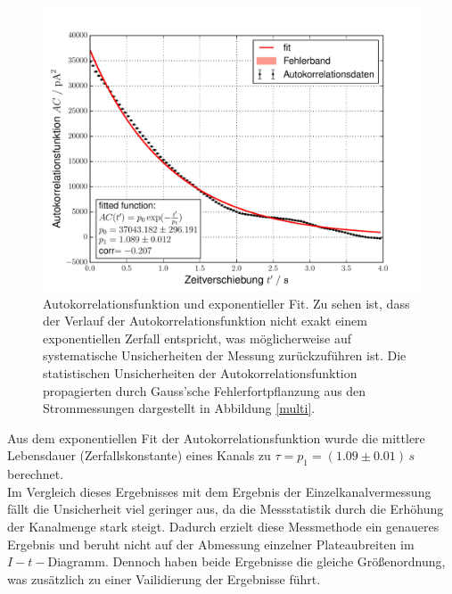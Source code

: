 \documentclass{include/thesisclass3}
\newcommand{\e}[1]{\,\si{#1}}
\begin{document}
\begin{figure}[H]
\centering
\includegraphics[scale=0.7]{images/AC.pdf}
\caption{Autokorrelationsfunktion und exponentieller Fit. Zu sehen ist, dass der Verlauf der Autokorrelationsfunktion nicht exakt einem exponentiellen Zerfall entspricht, was möglicherweise auf systematische Unsicherheiten der Messung zurückzuführen ist. Die statistischen Unsicherheiten der Autokorrelationsfunktion propagierten durch Gauss'sche Fehlerfortpflanzung aus den Strommessungen dargestellt in Abbildung \ref{multi}. }
\label{AC}
\end{figure}
Aus dem exponentiellen Fit der Autokorrelationsfunktion wurde die mittlere Lebensdauer (Zerfallskonstante) eines Kanals zu $\tau = p_1 = (1.09 \pm 0.01)\e{s}$ berechnet.\\
Im Vergleich dieses Ergebnisses mit dem Ergebnis der Einzelkanalvermessung fällt die Unsicherheit viel geringer aus, da die Messstatistik durch die Erhöhung der Kanalmenge stark steigt. Dadurch erzielt diese Messmethode ein genaueres Ergebnis und beruht nicht auf der Abmessung einzelner Plateaubreiten im $I-t-$Diagramm. Dennoch haben beide Ergebnisse die gleiche Größenordnung, was zusätzlich zu einer Vailidierung der Ergebnisse führt.
\end{document}
